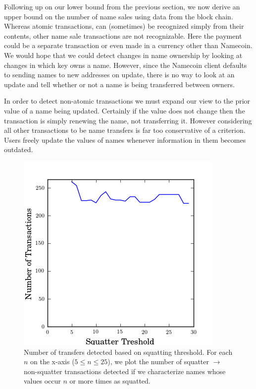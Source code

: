 Following up on our lower bound from the previous section, we now derive an upper bound on the number of name sales using data from the block chain. Whereas atomic transactions, can (sometimes) be recognized simply from their contents, other name sale transactions are not recognizable. Here the payment could be a separate transaction or even made in a currency other than Namecoin. We would hope that we could detect changes in name ownership by looking at changes in which key owns a name. However, since the Namecoin client defaults to sending names to new addresses on update, there is no way to look at an update and tell whether or not a name is being transferred between owners.

In order to detect non-atomic transactions we must expand our view to the prior value of a name being updated. Certainly if the value does not change then the transaction is simply renewing the name, not transferring it. However considering all other transactions to be name transfers is far too conservative of a criterion. Users freely update the values of names whenever information in them becomes outdated.

\begin{figure}
  \centering
  \includegraphics[width=0.9\columnwidth]{figures/transfers}
  \caption{Number of transfers detected based on squatting threshold. For each $n$ on the x-axis ($5 \leq n \leq 25$), we plot the number of squatter $\rightarrow$ non-squatter transactions detected if we characterize names whose values occur $n$ or more times as squatted.}
  \label{fig:percentSquatter}
\end{figure}

